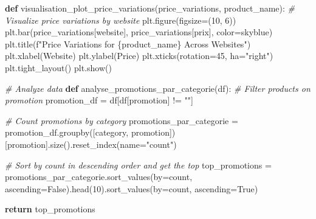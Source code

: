 \documentclass[
]{article}
\newenvironment{Shaded}{}{}
\newcommand{\CommentTok}[1]{\textcolor[rgb]{0.38,0.63,0.69}{\textit{#1}}}
\newcommand{\ControlFlowTok}[1]{\textcolor[rgb]{0.00,0.44,0.13}{\textbf{#1}}}
\newcommand{\DecValTok}[1]{\textcolor[rgb]{0.25,0.63,0.44}{#1}}
\newcommand{\KeywordTok}[1]{\textcolor[rgb]{0.00,0.44,0.13}{\textbf{#1}}}
\newcommand{\NormalTok}[1]{#1}
\newcommand{\OperatorTok}[1]{\textcolor[rgb]{0.40,0.40,0.40}{#1}}
\newcommand{\SpecialCharTok}[1]{\textcolor[rgb]{0.25,0.44,0.63}{#1}}
\newcommand{\SpecialStringTok}[1]{\textcolor[rgb]{0.73,0.40,0.53}{#1}}
\newcommand{\StringTok}[1]{\textcolor[rgb]{0.25,0.44,0.63}{#1}}
\newcommand{\VariableTok}[1]{\textcolor[rgb]{0.10,0.09,0.49}{#1}}
\begin{document}
\hypertarget{57be588f-1703-47b9-bd46-df09746ba453}{}
\begin{Shaded}
\begin{Highlighting}[]
\KeywordTok{def}\NormalTok{ visualisation\_plot\_price\_variations(price\_variations, product\_name):}
    \CommentTok{\# Visualize price variations by website}
\NormalTok{    plt.figure(figsize}\OperatorTok{=}\NormalTok{(}\DecValTok{10}\NormalTok{, }\DecValTok{6}\NormalTok{))}
\NormalTok{    plt.bar(price\_variations[}\StringTok{\textquotesingle{}website\textquotesingle{}}\NormalTok{], price\_variations[}\StringTok{\textquotesingle{}prix\textquotesingle{}}\NormalTok{], color}\OperatorTok{=}\StringTok{\textquotesingle{}skyblue\textquotesingle{}}\NormalTok{)}
\NormalTok{    plt.title(}\SpecialStringTok{f"Price Variations for }\SpecialCharTok{\{}\NormalTok{product\_name}\SpecialCharTok{\}}\SpecialStringTok{ Across Websites"}\NormalTok{)}
\NormalTok{    plt.xlabel(}\StringTok{\textquotesingle{}Website\textquotesingle{}}\NormalTok{)}
\NormalTok{    plt.ylabel(}\StringTok{\textquotesingle{}Price\textquotesingle{}}\NormalTok{)}
\NormalTok{    plt.xticks(rotation}\OperatorTok{=}\DecValTok{45}\NormalTok{, ha}\OperatorTok{=}\StringTok{"right"}\NormalTok{)}
\NormalTok{    plt.tight\_layout()}
\NormalTok{    plt.show()}
\end{Highlighting}
\end{Shaded}

\hypertarget{bc227788-5b35-4fc1-8278-90639bee279b}{}
\begin{Shaded}
\begin{Highlighting}[]
\CommentTok{\# Analyze data}
\KeywordTok{def}\NormalTok{ analyse\_promotions\_par\_categorie(df):}
    \CommentTok{\# Filter products on promotion}
\NormalTok{    promotion\_df }\OperatorTok{=}\NormalTok{ df[df[}\StringTok{\textquotesingle{}promotion\textquotesingle{}}\NormalTok{] }\OperatorTok{!=} \StringTok{""}\NormalTok{]}

    \CommentTok{\# Count promotions by category}
\NormalTok{    promotions\_par\_categorie }\OperatorTok{=}\NormalTok{ promotion\_df.groupby([}\StringTok{\textquotesingle{}category\textquotesingle{}}\NormalTok{, }\StringTok{\textquotesingle{}promotion\textquotesingle{}}\NormalTok{])[}\StringTok{\textquotesingle{}promotion\textquotesingle{}}\NormalTok{].size().reset\_index(name}\OperatorTok{=}\StringTok{"count"}\NormalTok{)}

    \CommentTok{\# Sort by \textquotesingle{}count\textquotesingle{} in descending order and get the top}
\NormalTok{    top\_promotions }\OperatorTok{=}\NormalTok{ promotions\_par\_categorie.sort\_values(by}\OperatorTok{=}\StringTok{\textquotesingle{}count\textquotesingle{}}\NormalTok{, ascending}\OperatorTok{=}\VariableTok{False}\NormalTok{).head(}\DecValTok{10}\NormalTok{).sort\_values(by}\OperatorTok{=}\StringTok{\textquotesingle{}count\textquotesingle{}}\NormalTok{, ascending}\OperatorTok{=}\VariableTok{True}\NormalTok{)}

    \ControlFlowTok{return}\NormalTok{ top\_promotions}
\end{Highlighting}
\end{Shaded}
\end{document}
